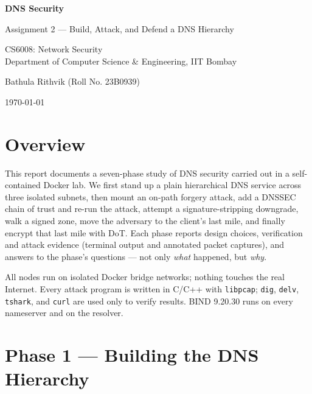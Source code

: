 \documentclass[11pt,a4paper]{article}
\newcommand{\authorname}{Bathula Rithvik \quad (Roll No. 23B0939)}
\begin{document}
\begin{titlepage}
\centering
\vspace*{3cm}
{\Huge\bfseries DNS Security\par}
\vspace{0.4cm}
{\Large Assignment 2 --- Build, Attack, and Defend a DNS Hierarchy\par}
\vspace{1.5cm}
{\large CS6008: Network Security \\ Department of Computer Science \& Engineering, IIT Bombay\par}
\vspace{2cm}
{\large \authorname\par}
\vfill
{\large \today\par}
\end{titlepage}

\tableofcontents
\newpage

\section*{Overview}
This report documents a seven-phase study of DNS security carried out in a self-contained
Docker lab. We first stand up a plain hierarchical DNS service across three isolated subnets,
then mount an on-path forgery attack, add a DNSSEC chain of trust and re-run the attack, attempt
a signature-stripping downgrade, walk a signed zone, move the adversary to the client's last mile,
and finally encrypt that last mile with DoT. Each phase reports design choices, verification and
attack evidence (terminal output and annotated packet captures), and answers to the phase's
questions --- not only \emph{what} happened, but \emph{why}.

All nodes run on isolated Docker bridge networks; nothing touches the real Internet. Every attack
program is written in C/C++ with \texttt{libpcap}; \texttt{dig}, \texttt{delv}, \texttt{tshark},
and \texttt{curl} are used only to verify results. BIND 9.20.30 runs on every nameserver and on
the resolver.

\section{Phase 1 --- Building the DNS Hierarchy}
\end{document}
